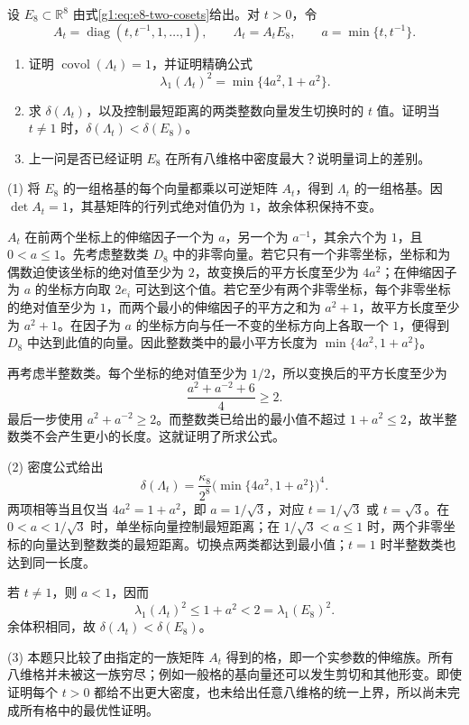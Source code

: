\begin{exercise}
	\label{g1:ex:e8-balanced-stretch}
	设 \(E_8\subset\mathbb R^8\) 由式\eqref{g1:eq:e8-two-cosets}给出。对 \(t>0\)，令
	\[
		A_t=\operatorname{diag}(t,t^{-1},1,\ldots,1),\qquad
		\Lambda_t=A_tE_8,\qquad a=\min\{t,t^{-1}\}.
	\]
	\begin{enumerate}
		\item 证明 \(\operatorname{covol}(\Lambda_t)=1\)，并证明精确公式
		\[
			\lambda_1(\Lambda_t)^2=\min\{4a^2,1+a^2\}.
		\]
		\item 求 \(\delta(\Lambda_t)\)，以及控制最短距离的两类整数向量发生切换时的 \(t\) 值。证明当 \(t\ne1\) 时，\(\delta(\Lambda_t)<\delta(E_8)\)。
		\item 上一问是否已经证明 \(E_8\) 在所有八维格中密度最大？说明量词上的差别。
	\end{enumerate}
\end{exercise}
\begin{solution}
	(1) 将 \(E_8\) 的一组格基的每个向量都乘以可逆矩阵 \(A_t\)，得到 \(\Lambda_t\) 的一组格基。因 \(\det A_t=1\)，其基矩阵的行列式绝对值仍为 \(1\)，故余体积保持不变。

	\(A_t\) 在前两个坐标上的伸缩因子一个为 \(a\)，另一个为 \(a^{-1}\)，其余六个为 \(1\)，且 \(0<a\le1\)。先考虑整数类 \(D_8\) 中的非零向量。若它只有一个非零坐标，坐标和为偶数迫使该坐标的绝对值至少为 \(2\)，故变换后的平方长度至少为 \(4a^2\)；在伸缩因子为 \(a\) 的坐标方向取 \(2e_i\) 可达到这个值。若它至少有两个非零坐标，每个非零坐标的绝对值至少为 \(1\)，而两个最小的伸缩因子的平方之和为 \(a^2+1\)，故平方长度至少为 \(a^2+1\)。在因子为 \(a\) 的坐标方向与任一不变的坐标方向上各取一个 \(1\)，便得到 \(D_8\) 中达到此值的向量。因此整数类中的最小平方长度为 \(\min\{4a^2,1+a^2\}\)。

	再考虑半整数类。每个坐标的绝对值至少为 \(1/2\)，所以变换后的平方长度至少为
	\[
		\frac{a^2+a^{-2}+6}{4}\ge2.
	\]
	最后一步使用 \(a^2+a^{-2}\ge2\)。而整数类已给出的最小值不超过 \(1+a^2\le2\)，故半整数类不会产生更小的长度。这就证明了所求公式。

	(2) 密度公式给出
	\[
		\delta(\Lambda_t)
		=\frac{\kappa_8}{2^8}
		\bigl(\min\{4a^2,1+a^2\}\bigr)^4.
	\]
	两项相等当且仅当 \(4a^2=1+a^2\)，即 \(a=1/\sqrt3\)，对应 \(t=1/\sqrt3\) 或 \(t=\sqrt3\)。在 \(0<a<1/\sqrt3\) 时，单坐标向量控制最短距离；在 \(1/\sqrt3<a\le1\) 时，两个非零坐标的向量达到整数类的最短距离。切换点两类都达到最小值；\(t=1\) 时半整数类也达到同一长度。

	若 \(t\ne1\)，则 \(a<1\)，因而
	\[
		\lambda_1(\Lambda_t)^2\le1+a^2<2
		=\lambda_1(E_8)^2.
	\]
	余体积相同，故 \(\delta(\Lambda_t)<\delta(E_8)\)。

	(3) 本题只比较了由指定的一族矩阵 \(A_t\) 得到的格，即一个实参数的伸缩族。所有八维格并未被这一族穷尽；例如一般格的基向量还可以发生剪切和其他形变。即使证明每个 \(t>0\) 都给不出更大密度，也未给出任意八维格的统一上界，所以尚未完成所有格中的最优性证明。
\end{solution}
